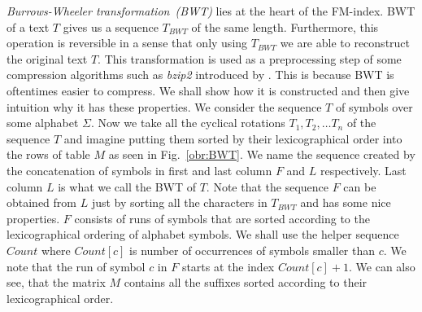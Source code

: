 \textit{Burrows-Wheeler transformation~(BWT)} lies at the heart of the FM-index.
BWT of a text $T$ gives us a sequence $\mathit{T_{BWT}}$ of the same length. Furthermore, this
operation is reversible in a sense that only using $\mathit{T_{BWT}}$ we are able to reconstruct
the original text $T$. This transformation is used as a preprocessing step of some compression
algorithms such as \textit{bzip2} introduced by \cite{seward1996bzip2}. This is because
BWT is oftentimes easier to compress. We shall show how it is constructed and then give 
intuition why it has these properties. We consider the sequence $T$ of symbols over some
alphabet $\Sigma$. Now we take all the cyclical rotations $T_1, T_2, \ldots T_n$ of
the sequence $T$ and imagine putting them sorted by their lexicographical order into the
rows of table $M$ as seen in Fig.~\ref{obr:BWT}. We name the sequence created by the
concatenation of symbols in first and last column $F$ and $L$ respectively. Last column $L$
is what we call the BWT of $T$. Note that the sequence $F$ can be obtained from $L$ just by
sorting all the characters in $\mathit{T_{BWT}}$ and has some nice properties. $F$ consists of
runs of symbols that are sorted according to the lexicographical ordering of alphabet symbols.
We shall use the helper sequence $\mathit{Count}$ where $\mathit{Count}[c]$ is number of
occurrences of symbols smaller than $c$. We note that the run of symbol $c$ in $F$ starts at
the index $\mathit{Count}[c]+1$. We can also see, that the matrix $M$ contains all the suffixes
sorted according to their lexicographical order.

